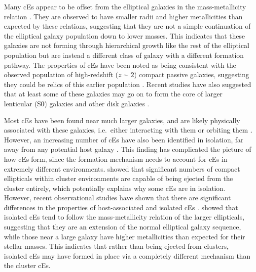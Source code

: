 \documentclass[a4paper,fleqn,usenatbib]{mnras}
\begin{document}
Many cEs appear to be offset from the elliptical galaxies in the mass-metallicity relation \citep{2018MNRAS.473.1819F}. They are observed to have smaller radii and higher metallicities \citep{2009Sci...326.1379C} than expected by these relations, suggesting that they are not a simple continuation of the elliptical galaxy population down to lower masses. This indicates that these galaxies are not forming through hierarchical growth like the rest of the elliptical population but are instead a different class of galaxy with a different formation pathway. The properties of cEs have been noted as being consistent with the observed population of high-redshift ($z\sim2$) compact passive galaxies, suggesting they could be relics of this earlier population \citep{2017MNRAS.468.4216Y,2011ApJ...739L..44D}. Recent studies have also suggested that at least some of these galaxies may go on to form the core of larger lenticular (S0) galaxies and other disk galaxies \citep{2018MNRAS.477.2030D,2015ApJ...804...32G}.

Most cEs have been found near much larger galaxies, and are likely physically associated with these galaxies, i.e.\ either interacting with them or orbiting them \citep{2017ApJ...835L...2Z}. However, an increasing number of cEs have also been identified in isolation, far away from any potential host galaxy \citep{2013MNRAS.430.1956H}. This finding has complicated the picture of how cEs form, since the formation mechanism needs to account for cEs in extremely different environments. \citet{2015Sci...348..418C} showed that significant numbers of compact ellipticals within cluster environments are capable of being ejected from the cluster entirely, which potentially explains why some cEs are in isolation. However, recent observational studies have shown that there are significant differences in the properties of host-associated and isolated cEs \citep{2020ApJ...903...65K,2018MNRAS.473.1819F}. \citet{2020ApJ...903...65K} showed that isolated cEs tend to follow the mass-metallicity relation of the larger ellipticals, suggesting that they are an extension of the normal elliptical galaxy sequence, while those near a large galaxy have higher metallicities than expected for their stellar masses. This indicates that rather than being ejected from clusters, isolated cEs may have formed in place via a completely different mechanism than the cluster cEs. 
\end{document}
